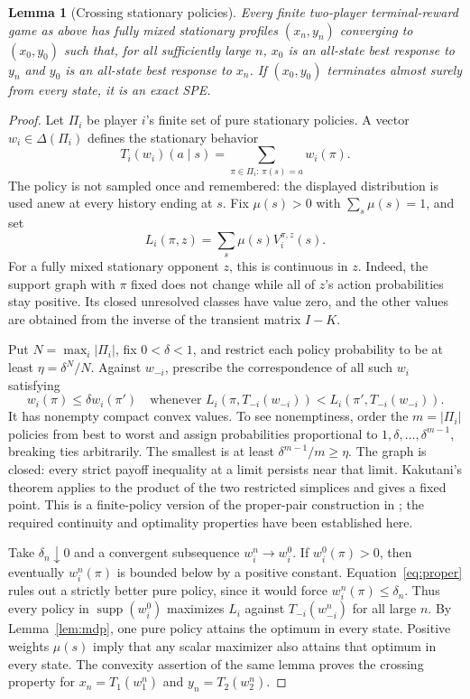 \documentclass[11pt]{article}
\newtheorem{lemma}[theorem]{Lemma}
\newcommand{\supp}{\operatorname{supp}}
\begin{document}
\begin{lemma}[Crossing stationary policies]\label{lem:cross}
Every finite two-player terminal-reward game as above has fully mixed
stationary profiles $(x_n,y_n)$ converging to $(x_0,y_0)$ such that, for
all sufficiently large $n$, $x_0$ is an all-state best response to $y_n$
and $y_0$ is an all-state best response to $x_n$.
If $(x_0,y_0)$ terminates almost surely from every state, it is an exact SPE.
\end{lemma}
\begin{proof}
Let $\Pi_i$ be player $i$'s finite set of pure stationary policies. A vector
$w_i\in\Delta(\Pi_i)$ defines the stationary behavior
\[
 T_i(w_i)(a\mid s)=\sum_{\pi\in\Pi_i:\,\pi(s)=a}w_i(\pi).
\]
The policy is not sampled once and remembered: the displayed distribution
is used anew at every history ending at $s$.
Fix $\mu(s)>0$ with $\sum_s\mu(s)=1$, and set
\[
 L_i(\pi,z)=\sum_s\mu(s)V_i^{\pi,z}(s).
\]
For a fully mixed stationary opponent $z$, this is continuous in $z$.
Indeed, the support graph with $\pi$ fixed does not change while all of
$z$'s action probabilities stay positive. Its closed unresolved classes
have value zero, and the other values are obtained from the inverse of
the transient matrix $I-K$.

Put $N=\max_i|\Pi_i|$, fix $0<\delta<1$, and restrict each policy
probability to be at least $\eta=\delta^N/N$.
Against $w_{-i}$, prescribe the correspondence of all such $w_i$ satisfying
\begin{equation}\label{eq:proper}
 w_i(\pi)\leq\delta w_i(\pi')
 \quad\text{whenever }L_i(\pi,T_{-i}(w_{-i}))
                  <L_i(\pi',T_{-i}(w_{-i})).
\end{equation}
It has nonempty compact convex values. To see nonemptiness, order the
$m=|\Pi_i|$ policies from best to worst and assign probabilities
proportional to $1,\delta,\ldots,\delta^{m-1}$, breaking ties arbitrarily.
The smallest is at least $\delta^{m-1}/m\geq\eta$.
The graph is closed: every strict payoff inequality at a limit persists
near that limit. Kakutani's theorem \cite[p.~458]{Kakutani} applies to the
product of the two restricted simplices and gives a fixed point.
This is a finite-policy version of the proper-pair construction in
\cite[Definition 2.3 and Theorem 2.4]{FTV}; the required continuity and
optimality properties have been established here.

Take $\delta_n\downarrow0$ and a convergent subsequence
$w_i^n\to w_i^0$. If $w_i^0(\pi)>0$, then eventually $w_i^n(\pi)$ is
bounded below by a positive constant. Equation~\eqref{eq:proper} rules
out a strictly better pure policy, since it would force
$w_i^n(\pi)\leq\delta_n$. Thus every policy in $\supp(w_i^0)$ maximizes
$L_i$ against $T_{-i}(w_{-i}^n)$ for all large $n$.
By Lemma~\ref{lem:mdp}, one pure policy attains the optimum in every
state. Positive weights $\mu(s)$ imply that any scalar maximizer also
attains that optimum in every state. The convexity assertion of the
same lemma proves the crossing property for
$x_n=T_1(w_1^n)$ and $y_n=T_2(w_2^n)$.


\end{proof}
\end{document}
